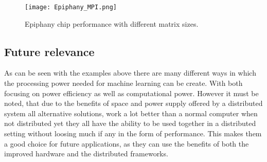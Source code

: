\begin{figure}
  \texttt{[image: Epiphany\_MPI.png]}
  \caption{Epiphany chip performance with different matrix sizes\cite{Rich15}.}
  \label{Epiphany_MPI}
\end{figure}

\subsection{Future relevance}
As can be seen with the examples above there are many different ways in which the
processing power needed for machine learning can be create. With both focusing
on power efficiency as well as computational power. However it must be noted,
that due to the benefits of space and power supply offered by a distributed system
all alternative solutions, work a lot better than a normal computer when not distributed
yet they all have the ability to be used together in a distributed setting without
loosing much if any in the form of performance. This makes them a good choice for
future applications, as they can use the benefits of both the improved hardware
and the distributed frameworks.
